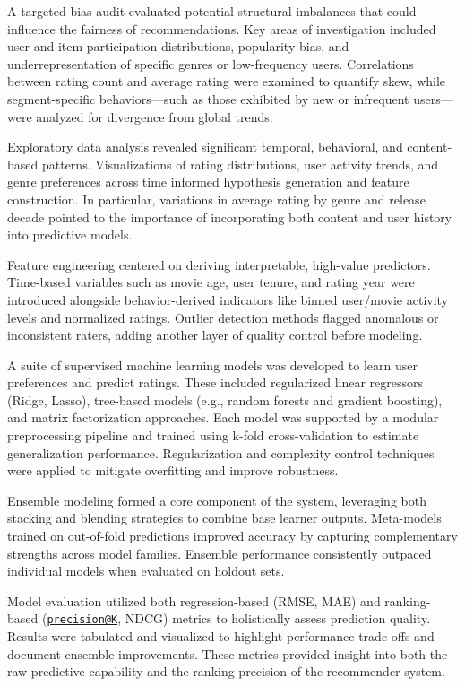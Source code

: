 \documentclass[
]{article}
\begin{document}
A targeted bias audit evaluated potential structural imbalances that
could influence the fairness of recommendations. Key areas of
investigation included user and item participation distributions,
popularity bias, and underrepresentation of specific genres or
low-frequency users. Correlations between rating count and average
rating were examined to quantify skew, while segment-specific
behaviors---such as those exhibited by new or infrequent users---were
analyzed for divergence from global trends.

Exploratory data analysis revealed significant temporal, behavioral, and
content-based patterns. Visualizations of rating distributions, user
activity trends, and genre preferences across time informed hypothesis
generation and feature construction. In particular, variations in
average rating by genre and release decade pointed to the importance of
incorporating both content and user history into predictive models.

Feature engineering centered on deriving interpretable, high-value
predictors. Time-based variables such as movie age, user tenure, and
rating year were introduced alongside behavior-derived indicators like
binned user/movie activity levels and normalized ratings. Outlier
detection methods flagged anomalous or inconsistent raters, adding
another layer of quality control before modeling.

A suite of supervised machine learning models was developed to learn
user preferences and predict ratings. These included regularized linear
regressors (Ridge, Lasso), tree-based models (e.g., random forests and
gradient boosting), and matrix factorization approaches. Each model was
supported by a modular preprocessing pipeline and trained using k-fold
cross-validation to estimate generalization performance. Regularization
and complexity control techniques were applied to mitigate overfitting
and improve robustness.

Ensemble modeling formed a core component of the system, leveraging both
stacking and blending strategies to combine base learner outputs.
Meta-models trained on out-of-fold predictions improved accuracy by
capturing complementary strengths across model families. Ensemble
performance consistently outpaced individual models when evaluated on
holdout sets.

Model evaluation utilized both regression-based (RMSE, MAE) and
ranking-based (\href{mailto:precision@K}{\nolinkurl{precision@K}}, NDCG)
metrics to holistically assess prediction quality. Results were
tabulated and visualized to highlight performance trade-offs and
document ensemble improvements. These metrics provided insight into both
the raw predictive capability and the ranking precision of the
recommender system.
\end{document}
